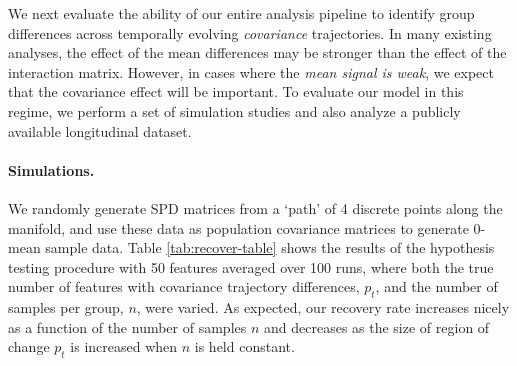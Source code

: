 We next evaluate the ability of our entire analysis 
pipeline to identify group differences across temporally evolving \textit{covariance} trajectories. 
In many existing analyses, the effect of the mean differences may be stronger than the effect of the interaction matrix. 
However, in cases where the {\em mean signal is weak}, we expect that the covariance effect will be important. To evaluate 
our model in this regime, we perform a set of simulation studies and also analyze a publicly available longitudinal dataset.

\paragraph{Simulations.} We randomly generate SPD matrices from a `path' of 4 discrete points along the manifold, and use these data 
as population 
covariance matrices to generate 0-mean sample data. Table \ref{tab:recover-table} shows the results of the hypothesis testing 
procedure with 50 features averaged over 100 runs, where both the true number of features with covariance trajectory differences, $p_t$, 
and the number of samples per group, $n$, were varied. 
As expected, our recovery rate increases nicely 
as a function of the number of samples $n$ and decreases as the size of region of change $p_t$ is increased when $n$ is held constant.


